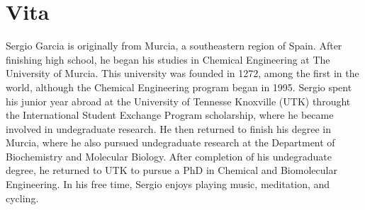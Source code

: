 \chapter*{Vita} \label{ch:vita}
Sergio Garcia is originally from Murcia, a southeastern region of Spain.
After finishing high school, he began his studies in Chemical Engineering at The University of Murcia. This university was founded in 1272, among the first in the world, although the Chemical Engineering program began in 1995.
Sergio spent his junior year abroad at the University of Tennesse Knoxville (UTK) throught the International Student Exchange Program scholarship, where he became involved in undegraduate research.
He then returned to finish his degree in Murcia, where he also pursued undegraduate research at the Department of Biochemistry and Molecular Biology.
After completion of his undegraduate degree, he returned to UTK to pursue a PhD in Chemical and Biomolecular Engineering.
In his free time, Sergio enjoys playing music, meditation, and cycling.
